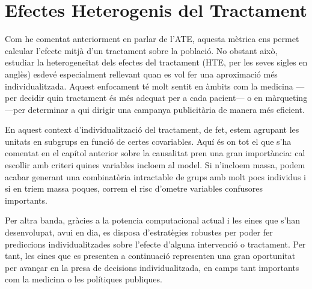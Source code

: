 \documentclass[../main.tex]{subfiles}
\begin{document}
 

\chapter{Efectes Heterogenis del Tractament} \label{ch:results}
    Com he comentat anteriorment en parlar de l’ATE, aquesta mètrica ens permet calcular l’efecte mitjà d’un tractament  sobre la població. No obstant això, estudiar la heterogeneïtat dels efectes del tractament (HTE, per les seves sigles en anglès) esdevé especialment rellevant quan es vol fer una aproximació més individualitzada. Aquest enfocament té molt sentit en àmbits com la medicina —per decidir quin tractament és més adequat per a cada pacient— o en màrqueting —per determinar a qui dirigir una campanya publicitària de manera més eficient.\par
    
    En aquest context d’individualització del tractament, de fet, estem agrupant les unitats en subgrups en funció de certes covariables. Aquí és on tot el que s’ha comentat en el capítol anterior sobre la causalitat pren una gran importància: cal escollir amb criteri quines variables incloem al model. Si n’incloem massa, podem acabar generant una combinatòria intractable de grups amb molt pocs individus i si en triem massa poques, correm el risc d’ometre variables confusores importants. \citep{Kent2018}

    Per altra banda, gràcies a la potencia computacional actual i les eines que s'han desenvolupat, avui en dia, es disposa d'estratègies robustes per poder fer prediccions individualitzades sobre l'efecte d'alguna intervenció o tractament. Per tant, les eines que es presenten a continuació representen una gran oportunitat per avançar en la presa de decisions individualitzada, en camps tant importants com la medicina o les polítiques publiques.
\end{document}
